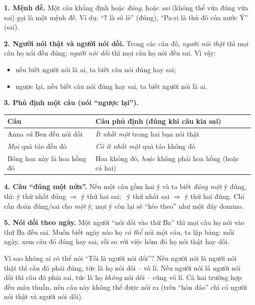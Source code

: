 \begin{knowbox}
\textbf{1. Mệnh đề.} Một câu khẳng định hoặc \emph{đúng}, hoặc \emph{sai} (không thể vừa đúng vừa sai) gọi là một mệnh đề.
Ví dụ: ``$7$ là số lẻ'' (đúng), ``Pa-ri là thủ đô của nước Ý'' (sai).

\textbf{2. Người nói thật và người nói dối.} Trong các câu đố, \emph{người nói thật} thì mọi câu họ nói đều đúng;
\emph{người nói dối} thì mọi câu họ nói đều sai. Vì vậy:
\begin{itemize}[leftmargin=1.4em,itemsep=1pt,topsep=2pt]
  \item nếu biết người nói là ai, ta biết câu nói đúng hay sai;
  \item ngược lại, nếu biết câu nói đúng hay sai, ta biết người nói là ai.
\end{itemize}

\textbf{3. Phủ định một câu (nói ``ngược lại'').}
\begin{center}
\renewcommand{\arraystretch}{1.25}
\begin{tabular}{|l|l|}
\hline
\rowcolor{tmBlue!10} Câu & Câu phủ định (đúng khi câu kia sai) \\ \hline
Anna \emph{và} Ben đều nói dối & \emph{Ít nhất một} trong hai bạn nói thật \\ \hline
\emph{Mọi} quả táo đều đỏ & \emph{Có ít nhất một} quả táo không đỏ \\ \hline
Bông hoa này là hoa hồng đỏ & Hoa không đỏ, \emph{hoặc} không phải hoa hồng (hoặc cả hai) \\ \hline
\end{tabular}
\end{center}

\textbf{4. Câu ``đúng một nửa''.} Nếu một câu gồm hai ý và ta biết \emph{đúng một} ý đúng, thì:
ý thứ nhất đúng $\Rightarrow$ ý thứ hai sai; \ ý thứ nhất sai $\Rightarrow$ ý thứ hai đúng. Chỉ cần đoán đúng/sai cho \emph{một} ý,
mọi ý còn lại sẽ ``kéo theo'' như một dây domino.

\textbf{5. Nói dối theo ngày.} Một người ``nói dối vào thứ Ba'' thì mọi câu họ nói vào thứ Ba đều sai. Muốn biết ngày nào họ
\emph{có thể} nói một câu, ta lập bảng: mỗi ngày, xem câu đó đúng hay sai, rồi so với việc hôm đó họ nói thật hay dối.
\end{knowbox}
\begin{proofbox}
Vì sao không ai có thể nói ``Tôi là người nói dối''? Nếu người nói là người nói thật thì câu đó phải đúng, tức là họ nói dối --
vô lí. Nếu người nói là người nói dối thì câu đó phải sai, tức là họ \emph{không} nói dối -- cũng vô lí. Cả hai trường hợp đều
mâu thuẫn, nên câu này không thể được nói ra (trên ``hòn đảo'' chỉ có người nói thật và người nói dối).
\end{proofbox}
